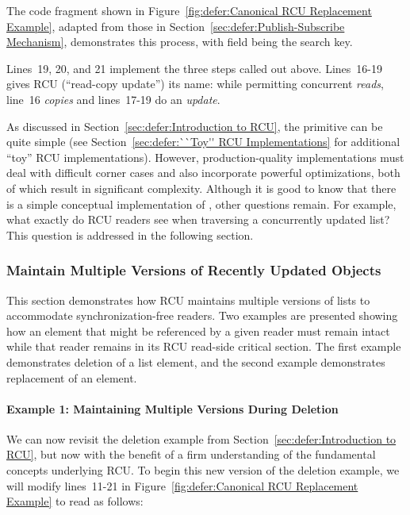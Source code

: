 The code fragment shown in
Figure~\ref{fig:defer:Canonical RCU Replacement Example},
adapted from those in Section~\ref{sec:defer:Publish-Subscribe Mechanism},
demonstrates this process, with field  being the search key.

Lines~19, 20, and 21 implement the three steps called out above.
Lines~16-19 gives RCU (``read-copy update'') its name: while permitting
concurrent \emph{reads}, line~16 \emph{copies} and lines~17-19
do an \emph{update}.

As discussed in Section~\ref{sec:defer:Introduction to RCU},
the  primitive can be quite simple
(see Section~\ref{sec:defer:``Toy'' RCU Implementations}
for additional ``toy'' RCU implementations).
However, production-quality implementations must deal with
difficult corner cases and also incorporate
powerful optimizations, both of which result in significant complexity.
Although it is good to know that there is a simple conceptual
implementation of , other questions remain.
For example, what exactly do RCU
readers see when traversing a concurrently updated list?
This question is addressed in the following section.

\subsubsection{Maintain Multiple Versions of Recently Updated Objects}
\label{sec:defer:Maintain Multiple Versions of Recently Updated Objects}

This section demonstrates how RCU maintains multiple versions of
lists to accommodate synchronization-free readers.
Two examples are presented showing how an element
that might be referenced by a given reader must remain intact
while that reader remains in its RCU read-side critical section.
The first example demonstrates deletion of a list element,
and the second example demonstrates replacement of an element.

\paragraph{Example 1: Maintaining Multiple Versions During Deletion}
\label{sec:defer:Example 1: Maintaining Multiple Versions During Deletion}

We can now revisit the deletion example from
Section~\ref{sec:defer:Introduction to RCU},
but now with the benefit of a firm understanding of the fundamental
concepts underlying RCU.
To begin this new version of the deletion example,
we will modify lines~11-21 in
Figure~\ref{fig:defer:Canonical RCU Replacement Example}
to read as follows:


